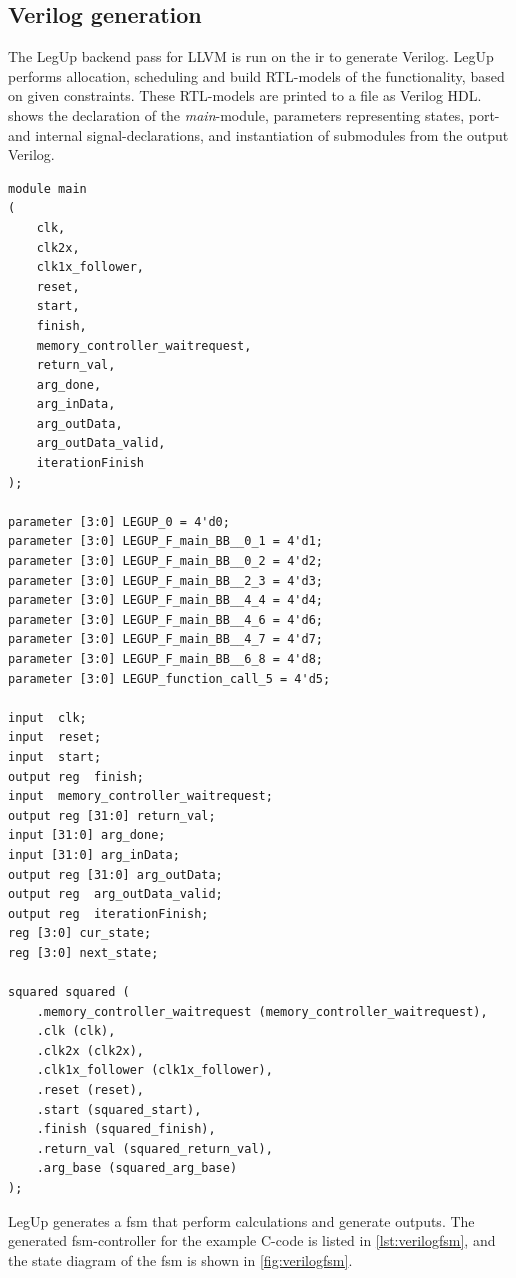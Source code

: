 \subsection{Verilog generation}
The LegUp backend pass for LLVM is run on the \gls{ir} to generate Verilog. LegUp performs allocation, scheduling and build RTL-models of the functionality, based on given constraints. These RTL-models are printed to a file as Verilog HDL.  shows the declaration of the \textit{main}-module, parameters representing states, port- and internal signal-declarations, and instantiation of submodules from the output Verilog.
\clearpage
\lstset{language=Verilog, style=VerilogStyle}
\begin{lstlisting}[caption={Verilog module, port, signal and parameter declaration, and sub-module instantiation},label=lst:verilogmodule1]
module main
(
	clk,
	clk2x,
	clk1x_follower,
	reset,
	start,
	finish,
	memory_controller_waitrequest,
	return_val,
	arg_done,
	arg_inData,
	arg_outData,
	arg_outData_valid,
	iterationFinish
);

parameter [3:0] LEGUP_0 = 4'd0;
parameter [3:0] LEGUP_F_main_BB__0_1 = 4'd1;
parameter [3:0] LEGUP_F_main_BB__0_2 = 4'd2;
parameter [3:0] LEGUP_F_main_BB__2_3 = 4'd3;
parameter [3:0] LEGUP_F_main_BB__4_4 = 4'd4;
parameter [3:0] LEGUP_F_main_BB__4_6 = 4'd6;
parameter [3:0] LEGUP_F_main_BB__4_7 = 4'd7;
parameter [3:0] LEGUP_F_main_BB__6_8 = 4'd8;
parameter [3:0] LEGUP_function_call_5 = 4'd5;

input  clk;
input  reset;
input  start;
output reg  finish;
input  memory_controller_waitrequest;
output reg [31:0] return_val;
input [31:0] arg_done;
input [31:0] arg_inData;
output reg [31:0] arg_outData;
output reg  arg_outData_valid;
output reg  iterationFinish;
reg [3:0] cur_state;
reg [3:0] next_state;

squared squared (
	.memory_controller_waitrequest (memory_controller_waitrequest),
	.clk (clk),
	.clk2x (clk2x),
	.clk1x_follower (clk1x_follower),
	.reset (reset),
	.start (squared_start),
	.finish (squared_finish),
	.return_val (squared_return_val),
	.arg_base (squared_arg_base)
);
\end{lstlisting}
LegUp generates a \gls{fsm} that perform calculations and generate outputs. The generated \gls{fsm}-controller for the example C-code is listed in \cref{lst:verilogfsm}, and the state diagram of the \gls{fsm} is shown in \cref{fig:verilogfsm}.
